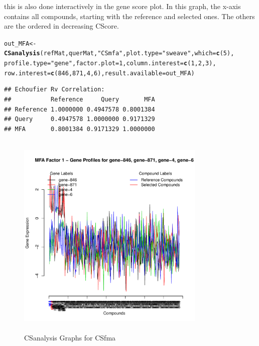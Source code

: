 \documentclass[a4paper]{article}\usepackage[]{graphicx}\usepackage[]{color}
\makeatletter
\newcommand{\hlnum}[1]{\textcolor[rgb]{0.686,0.059,0.569}{#1}}%
\newcommand{\hlstr}[1]{\textcolor[rgb]{0.192,0.494,0.8}{#1}}%
\newcommand{\hlstd}[1]{\textcolor[rgb]{0.345,0.345,0.345}{#1}}%
\newcommand{\hlkwb}[1]{\textcolor[rgb]{0.69,0.353,0.396}{#1}}%
\newcommand{\hlkwc}[1]{\textcolor[rgb]{0.333,0.667,0.333}{#1}}%
\newcommand{\hlkwd}[1]{\textcolor[rgb]{0.737,0.353,0.396}{\textbf{#1}}}%
\newenvironment{kframe}{%
 \def\at@end@of@kframe{}%
 \ifinner\ifhmode%
  \def\at@end@of@kframe{\end{minipage}}%
  \begin{minipage}{\columnwidth}%
 \fi\fi%
 \def\FrameCommand##1{\hskip\@totalleftmargin \hskip-\fboxsep
 \colorbox{shadecolor}{##1}\hskip-\fboxsep
     \hskip-\linewidth \hskip-\@totalleftmargin \hskip\columnwidth}%
 \MakeFramed {\advance\hsize-\width
   \@totalleftmargin\z@ \linewidth\hsize
   \@setminipage}}%
 {\par\unskip\endMakeFramed%
 \at@end@of@kframe}
\newenvironment{knitrout}{}{} %
\makeatother
\begin{document}
this is also done interactively in the gene score plot. In this graph, the
x-axis contains all compounds, starting with the reference and selected ones.
The others are the ordered in decreasing CScore.
\begin{knitrout}
\color{fgcolor}\begin{kframe}
\begin{alltt}
        \hlstd{out_MFA} \hlkwb{<-} \hlkwd{CSanalysis}\hlstd{(refMat,querMat,}\hlstr{"CSmfa"}\hlstd{,}\hlkwc{plot.type}\hlstd{=}\hlstr{"sweave"}\hlstd{,}\hlkwc{which}\hlstd{=}\hlkwd{c}\hlstd{(}\hlnum{5}\hlstd{),}
                        \hlkwc{profile.type}\hlstd{=}\hlstr{"gene"}\hlstd{,}\hlkwc{factor.plot}\hlstd{=}\hlnum{1}\hlstd{,}\hlkwc{column.interest}\hlstd{=}\hlkwd{c}\hlstd{(}\hlnum{1}\hlstd{,}\hlnum{2}\hlstd{,}\hlnum{3}\hlstd{),}
                        \hlkwc{row.interest}\hlstd{=}\hlkwd{c}\hlstd{(}\hlnum{846}\hlstd{,}\hlnum{871}\hlstd{,}\hlnum{4}\hlstd{,}\hlnum{6}\hlstd{),}\hlkwc{result.available}\hlstd{=out_MFA)}
\end{alltt}
\begin{verbatim}
## Echoufier Rv Correlation:
##           Reference     Query       MFA
## Reference 1.0000000 0.4947578 0.8001384
## Query     0.4947578 1.0000000 0.9171329
## MFA       0.8001384 0.9171329 1.0000000
\end{verbatim}
\end{kframe}\begin{figure}[H]


\includegraphics[width=9cm,height=10cm]{figure/MFA3-1} \hfill{}

\caption[CSanalysis Graphs for CSfma]{CSanalysis Graphs for CSfma\label{fig:MFA3}}
\end{figure}


\end{knitrout}
\end{document}
